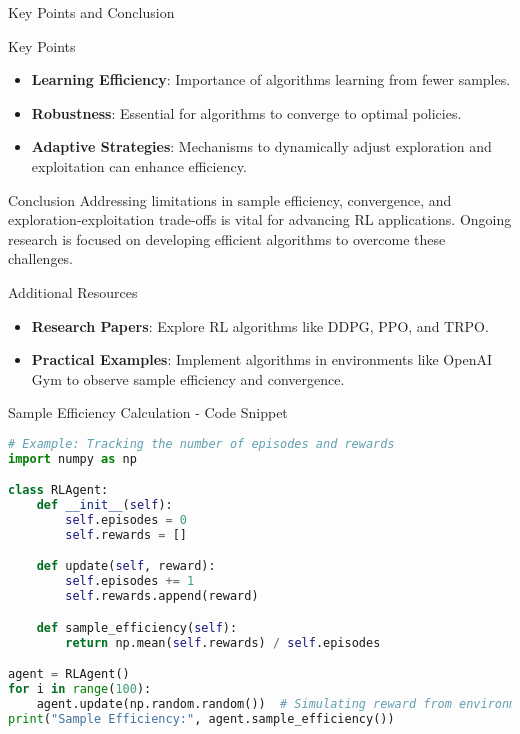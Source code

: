 \documentclass[aspectratio=169]{beamer}
\begin{document}
\begin{frame}[fragile]{Key Points and Conclusion}
    \begin{block}{Key Points}
        \begin{itemize}
            \item \textbf{Learning Efficiency}: Importance of algorithms learning from fewer samples.
            \item \textbf{Robustness}: Essential for algorithms to converge to optimal policies.
            \item \textbf{Adaptive Strategies}: Mechanisms to dynamically adjust exploration and exploitation can enhance efficiency.
        \end{itemize}
    \end{block}

    \begin{block}{Conclusion}
        Addressing limitations in sample efficiency, convergence, and exploration-exploitation trade-offs is vital for advancing RL applications. Ongoing research is focused on developing efficient algorithms to overcome these challenges.
    \end{block}
\end{frame}

\begin{frame}[fragile]{Additional Resources}
    \begin{itemize}
        \item \textbf{Research Papers}: Explore RL algorithms like DDPG, PPO, and TRPO.
        \item \textbf{Practical Examples}: Implement algorithms in environments like OpenAI Gym to observe sample efficiency and convergence.
    \end{itemize}
\end{frame}

\begin{frame}[fragile]{Sample Efficiency Calculation - Code Snippet}
    \begin{lstlisting}[language=Python]
# Example: Tracking the number of episodes and rewards
import numpy as np

class RLAgent:
    def __init__(self):
        self.episodes = 0
        self.rewards = []

    def update(self, reward):
        self.episodes += 1
        self.rewards.append(reward)

    def sample_efficiency(self):
        return np.mean(self.rewards) / self.episodes

agent = RLAgent()
for i in range(100):
    agent.update(np.random.random())  # Simulating reward from environment
print("Sample Efficiency:", agent.sample_efficiency())
    \end{lstlisting}
\end{frame}
\end{document}
